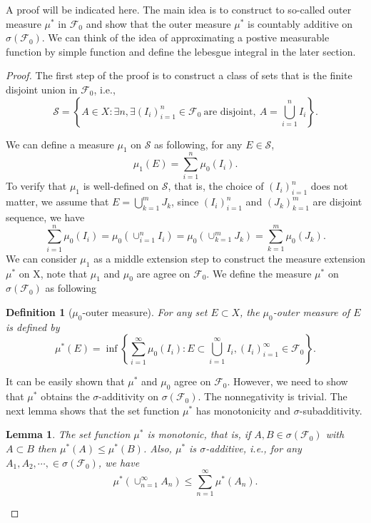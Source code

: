 \documentclass[11pt,english]{smfart}
\newtheorem{definition}[theorem]{Definition}
\newtheorem{lemma}[theorem]{Lemma}
\newcommand{\mc}{\mathcal}
\begin{document}
A proof will be indicated here. The main idea is to construct to so-called outer measure $\mu^*$ in $\mc{F}_0$ and show that the outer measure $\mu^*$ is countably additive on $\sigma(\mc{F}_0)$. We can think of the idea of approximating a postive measurable function by simple function and define the lebesgue integral in the later section.
\begin{proof}
    The first step of the proof is to construct a class of sets that is the finite disjoint union in $\mc{F}_0$, i.e.,
    $$\mc{S} = \left\{A \in X: \exists n, \exists (I_i)_{i=1}^n \in \mc{F}_0 \ \text{are disjoint},\ A= \bigcup_{i=1}^n I_i \right\}.$$

    We can define a measure $\mu_1$ on $\mc{S}$ as following, for any $E\in \mc{S}$,
    $$\mu_1(E) = \sum_{i=1}^n \mu_0(I_i).$$
    To verify that $\mu_1$ is well-defined on $\mc{S}$, that is, the choice of $(I_i)_{i=1}^n$ does not matter, we assume that $E = \bigcup_{k=1}^m J_k$, since $(I_i)_{i=1}^n$ and $(J_k)_{k=1}^m$ are disjoint sequence, we have $$\sum_{i=1}^n \mu_0(I_i) = \mu_0\left(\cup_{i=1}^n I_i\right) = \mu_0\left(\cup_{k=1}^m J_k\right) = \sum_{k=1}^m \mu_0(J_k).$$
    We can consider $\mu_1$ as a middle extension step to construct the measure extension $\mu^*$ on X, note that $\mu_1$ and $\mu_0$ are agree on $\mc{F}_0$. We define the measure $\mu^*$ on $\sigma(\mc{F}_0)$ as following\\

    \begin{definition}[$\mu_0$-outer measure]
        For any set $E\subset X$, the $\mu_0$-outer measure of $E$ is defined by $$\mu^*(E) = \inf \left\{\sum_{i=1}^\infty \mu_0(I_i) : E \subset \bigcup_{i=1}^\infty I_i, (I_i)_{i=1}^\infty \in \mc{F}_0\right\}.$$
    \end{definition}

    It can be easily shown that $\mu^*$ and $\mu_0$ agree on $\mc{F}_0$. However, we need to show that $\mu^*$ obtains the $\sigma$-additivity on $\sigma(\mc{F}_0)$. The nonnegativity is trivial. The next lemma shows that the set function $\mu^*$ has monotonicity and $\sigma$-subadditivity. \\
    
    \begin{lemma}
        The set function $\mu^*$ is monotonic, that is, if $A,B \in \sigma(\mc{F}_0)$ with $A\subset B$ then $\mu^*(A) \leq \mu^*(B)$. Also, $\mu^*$ is $\sigma$-additive, i.e., for any $A_1,A_2,\cdots,\in \sigma(\mc{F}_0)$, we have $$\mu^*(\cup_{n=1}^\infty A_n) \leq \sum_{n=1}^\infty \mu^*(A_n).$$
    \end{lemma}


\end{proof}
\end{document}
